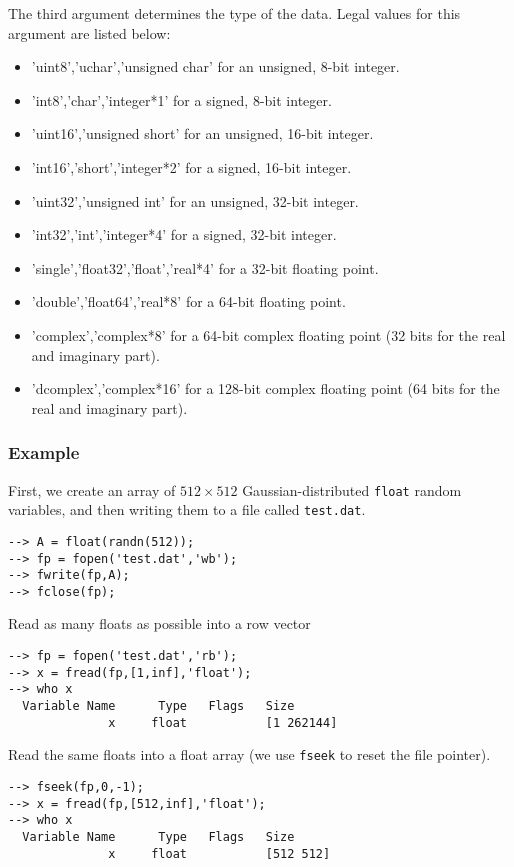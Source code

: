 The third argument determines the type of the data.  Legal values for this
argument are listed below:
\begin{itemize}
\item 'uint8','uchar','unsigned char' for an unsigned, 8-bit integer.
\item 'int8','char','integer*1' for a signed, 8-bit integer.
\item 'uint16','unsigned short' for an unsigned, 16-bit  integer.
\item 'int16','short','integer*2' for a signed, 16-bit integer.
\item 'uint32','unsigned int' for an unsigned, 32-bit integer.
\item 'int32','int','integer*4' for a signed, 32-bit integer.
\item 'single','float32','float','real*4' for a 32-bit floating point.
\item 'double','float64','real*8' for a 64-bit floating point.
\item 'complex','complex*8' for a 64-bit complex floating point (32 bits 
for the real and imaginary part).
\item 'dcomplex','complex*16' for a 128-bit complex floating point (64
bits for the real and imaginary part).
\end{itemize}
\subsubsection{Example}
First, we create an array of $512 \times 512$ Gaussian-distributed \verb|float| random variables, and then writing them to a file called \verb|test.dat|.
\begin{verbatim}
--> A = float(randn(512));
--> fp = fopen('test.dat','wb');
--> fwrite(fp,A);
--> fclose(fp);
\end{verbatim}
Read as many floats as possible into a row vector
\begin{verbatim}
--> fp = fopen('test.dat','rb');
--> x = fread(fp,[1,inf],'float');
--> who x
  Variable Name      Type   Flags   Size
              x     float           [1 262144]
\end{verbatim}
Read the same floats into a float array (we use \verb|fseek| to reset the file pointer).
\begin{verbatim}
--> fseek(fp,0,-1);
--> x = fread(fp,[512,inf],'float');
--> who x
  Variable Name      Type   Flags   Size
              x     float           [512 512]
\end{verbatim}
